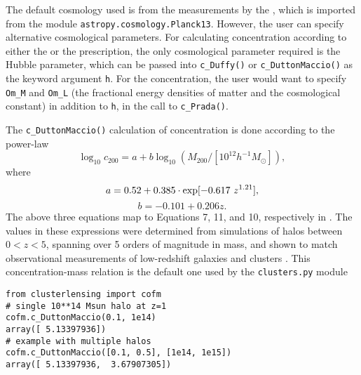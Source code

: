 \documentclass{emulateapj}
\newcommand{\code}{\lstinline[style=codeintext]}
\begin{document}

The default cosmology used is from the measurements by the \citet{PlanckXVI}, which is imported from the module \code{astropy.cosmology.Planck13}. However, the user can specify alternative cosmological parameters. For calculating concentration according to either the \citet{Duffy08} or the \citet{Dutton14} prescription, the only cosmological parameter required is the Hubble parameter, which can be passed into \code{c_Duffy()} or \code{c_DuttonMaccio()} as the keyword argument \code{h}. For the \citet{Prada12} concentration, the user would want to specify \code{Om_M} and \code{Om_L} (the fractional energy densities of matter and the cosmological constant) in addition to \code{h}, in the call to \code{c_Prada()}.

The \code{c_DuttonMaccio()} calculation of concentration is done according to the power-law
\begin{equation}
\log_{10} c_{200} = a + b \log_{10}(M_{200} / [10^{12} h^{-1} M_{\odot}]), 
\end{equation}
where
\begin{equation}
a = 0.52 + 0.385 \cdot {\rm exp}[-0.617\ z^{1.21}],
\end{equation}
\begin{equation}
b = -0.101 + 0.206 z.
\end{equation}
The above three equations map to Equations 7, 11, and 10, respectively in \citet{Dutton14}. The values in these expressions were determined from simulations of halos between $0 < z < 5$, spanning over 5 orders of magnitude in mass, and shown to match observational measurements of low-redshift galaxies and clusters \citep{Dutton14}. This concentration-mass relation is the default one used by the \code{clusters.py} module

\begin{lstlisting}
from clusterlensing import cofm
# single 10**14 Msun halo at z=1
cofm.c_DuttonMaccio(0.1, 1e14)
array([ 5.13397936])
# example with multiple halos
cofm.c_DuttonMaccio([0.1, 0.5], [1e14, 1e15])
array([ 5.13397936,  3.67907305])
\end{lstlisting}
\end{document}
